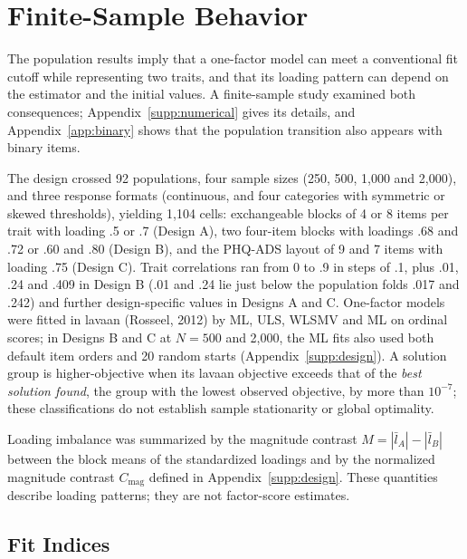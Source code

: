 \section{Finite-Sample Behavior}
\label{sec:numerical}
\label{sec:finite-sample}

The population results imply that a one-factor model can meet a conventional fit cutoff while representing two traits, and that its loading pattern can depend on the estimator and the initial values. A finite-sample study examined both consequences; Appendix~\ref{supp:numerical} gives its details, and Appendix~\ref{app:binary} shows that the population transition also appears with binary items.

The design crossed 92 populations, four sample sizes (250, 500, 1,000 and 2,000), and three response formats (continuous, and four categories with symmetric or skewed thresholds), yielding 1,104 cells: exchangeable blocks of 4 or 8 items per trait with loading .5 or .7 (Design A), two four-item blocks with loadings .68 and .72 or .60 and .80 (Design B), and the PHQ-ADS layout of 9 and 7 items with loading .75 (Design C). Trait correlations ran from 0 to .9 in steps of .1, plus .01, .24 and .409 in Design B (.01 and .24 lie just below the population folds .017 and .242) and further design-specific values in Designs A and C. One-factor models were fitted in lavaan (Rosseel, 2012) by ML, ULS, WLSMV and ML on ordinal scores; in Designs B and C at $N=500$ and 2,000, the ML fits also used both default item orders and 20 random starts (Appendix~\ref{supp:design}). A solution group is higher-objective when its lavaan objective exceeds that of the \emph{best solution found}, the group with the lowest observed objective, by more than $10^{-7}$; these classifications do not establish sample stationarity or global optimality.

Loading imbalance was summarized by the magnitude contrast $M=|\bar l_A|-|\bar l_B|$ between the block means of the standardized loadings and by the normalized magnitude contrast $C_{\mathrm{mag}}$ defined in Appendix~\ref{supp:design}. These quantities describe loading patterns; they are not factor-score estimates.

\subsection{Fit Indices}

